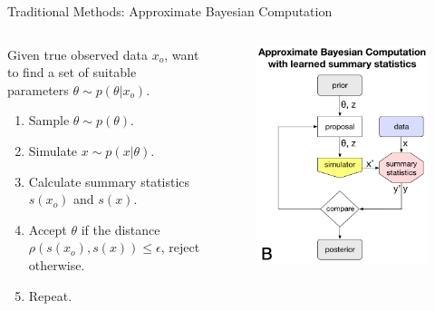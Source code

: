 \documentclass[12pt, aspectratio=169]{beamer}
\let\olditem\item
\renewcommand\item{\olditem\justifying}
\begin{document}
\begin{frame}{Traditional Methods: Approximate Bayesian Computation}

\begin{columns}
    \begin{column}{0.6\textwidth}
        Given true observed data $x_o$, want to find a set of suitable parameters $\theta \sim p(\theta | x_o)$.
        \begin{enumerate}[<+->]
            \item Sample $\theta \sim p(\theta)$.
            \item Simulate $x \sim p(x | \theta)$.
            \item Calculate summary statistics $s(x_o)$ and $s(x)$.
            \item Accept $\theta$ if the distance $\rho(s(x_o), s(x)) \leq \epsilon$, reject otherwise.
            \item Repeat.
        \end{enumerate}
         \parencite{rubin_bayesianly_1984}
    \end{column}
    
    \begin{column}{0.4\textwidth}
        \begin{figure}
            \centering
            \includegraphics[height=0.62\textheight]{"images/ABC_s2.png"}
            \caption{\cite{cranmer_frontier_2020}}
        \end{figure}
    \end{column}
\end{columns}


\end{frame}
\end{document}
